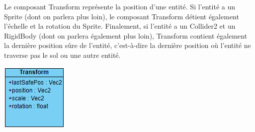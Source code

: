 \documentclass[12pt, openany]{report}
\begin{document}
\noindent
\begin{minipage}{.6\textwidth}
\par Le composant Transform repr\'esente la position d'une entit\'e. Si l'entit\'e a un Sprite (dont on parlera plus loin), le composant Transform d\'etient \'egalement l'\'echelle et la rotation du Sprite. Finalement, si l'entit\'e a un Collider2 et un RigidBody (dont on parlera \'egalement plus loin), Transform contient \'egalement la derni\`ere position s\^ure de l'entit\'e, c'est-\`a-dire la derni\`ere position o\`u l'entit\'e ne traverse pas le sol ou une autre entit\'e.
\end{minipage}
\hfill
\begin{minipage}{.35\textwidth}
\includegraphics[width=\textwidth]{transform.png}
\end{minipage}
\vspace{0.3cm}
\noindent
\end{document}
